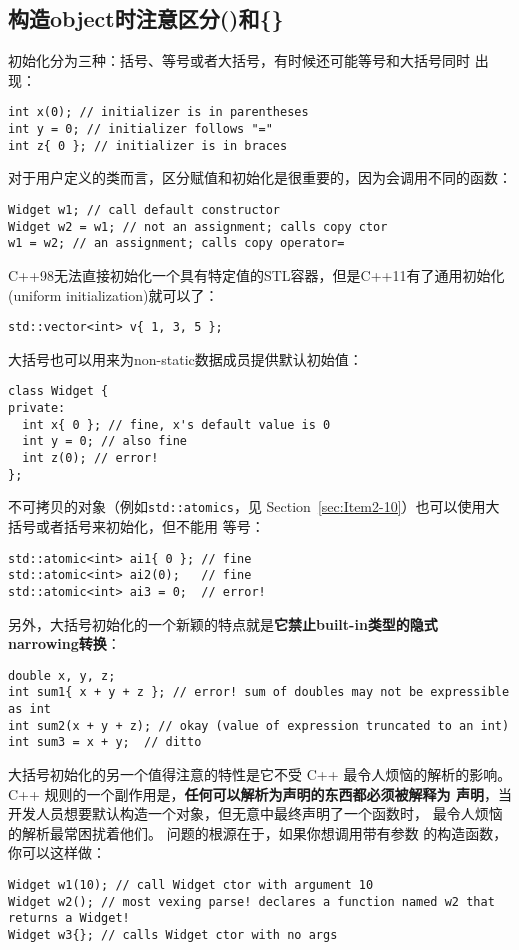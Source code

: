 \subsection{构造object时注意区分()和\{\}}
\label{sec:Item2-7}

初始化分为三种：括号、等号或者大括号，有时候还可能等号和大括号同时
出现：
\begin{verbatim}
int x(0); // initializer is in parentheses
int y = 0; // initializer follows "="
int z{ 0 }; // initializer is in braces
\end{verbatim}

对于用户定义的类而言，区分赋值和初始化是很重要的，因为会调用不同的函数：
\begin{verbatim}
Widget w1; // call default constructor
Widget w2 = w1; // not an assignment; calls copy ctor
w1 = w2; // an assignment; calls copy operator=
\end{verbatim}

C++98无法直接初始化一个具有特定值的STL容器，但是C++11有了通用初始化
(uniform initialization)就可以了：
\begin{verbatim}
std::vector<int> v{ 1, 3, 5 };
\end{verbatim}

大括号也可以用来为non-static数据成员提供默认初始值：
\begin{verbatim}
class Widget {
private:
  int x{ 0 }; // fine, x's default value is 0
  int y = 0; // also fine
  int z(0); // error!
};
\end{verbatim}

不可拷贝的对象（例如\texttt{std::atomics}，见
Section~\ref{sec:Item2-10}）也可以使用大括号或者括号来初始化，但不能用
等号：
\begin{verbatim}
std::atomic<int> ai1{ 0 }; // fine
std::atomic<int> ai2(0);   // fine
std::atomic<int> ai3 = 0;  // error!
\end{verbatim}

另外，大括号初始化的一个新颖的特点就是\textbf{它禁止built-in类型的隐式
  narrowing转换}：
\begin{verbatim}
double x, y, z;
int sum1{ x + y + z }; // error! sum of doubles may not be expressible
as int 
int sum2(x + y + z); // okay (value of expression truncated to an int)
int sum3 = x + y;  // ditto
\end{verbatim}

大括号初始化的另一个值得注意的特性是它不受 C++ 最令人烦恼的解析的影响。
C++ 规则的一个副作用是，\textbf{任何可以解析为声明的东西都必须被解释为
  声明}，当开发人员想要默认构造一个对象，但无意中最终声明了一个函数时，
最令人烦恼的解析最常困扰着他们。 问题的根源在于，如果你想调用带有参数
的构造函数，你可以这样做：
\begin{verbatim}
Widget w1(10); // call Widget ctor with argument 10
Widget w2(); // most vexing parse! declares a function named w2 that returns a Widget!
Widget w3{}; // calls Widget ctor with no args
\end{verbatim}

